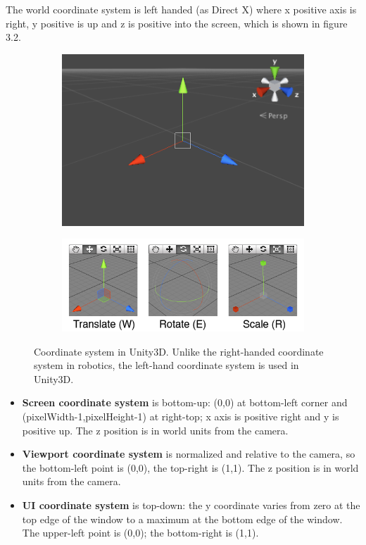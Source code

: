 The world coordinate system is left handed (as Direct X) where x positive axis is right, y positive is up and z is positive into the screen, which is shown in figure 3.2.

\begin{figure}[h]
	\centering
	\begin{subfigure}{.6\textwidth}
		\centering
		\includegraphics[width=\textwidth]{Figures/Section3_CoordinateSystem.png}
	\end{subfigure}
	\begin{subfigure}{.7\textwidth}
		\centering
		\includegraphics[width=\textwidth]{Figures/Section3_Transform}
	\end{subfigure}
	\caption{Coordinate system in Unity3D. Unlike the right-handed coordinate system in robotics, the left-hand coordinate system is used in Unity3D. }
	\label{fig: Coordinate unity}
\end{figure}

\begin{itemize}
	\item \textbf{Screen coordinate system} is bottom-up: (0,0) at bottom-left corner and (pixelWidth-1,pixelHeight-1) at right-top; x axis is positive right and y is positive up. The z position is in world units from the camera.
	\item \textbf{Viewport coordinate system} is normalized and relative to the camera, so the bottom-left point is (0,0), the top-right is (1,1). The z position is in world units from the camera.
	\item \textbf{UI coordinate system} is top-down: the y coordinate varies from zero at the top edge of the window to a maximum at the bottom edge of the window. The upper-left point is (0,0); the bottom-right is (1,1).
\end{itemize}


